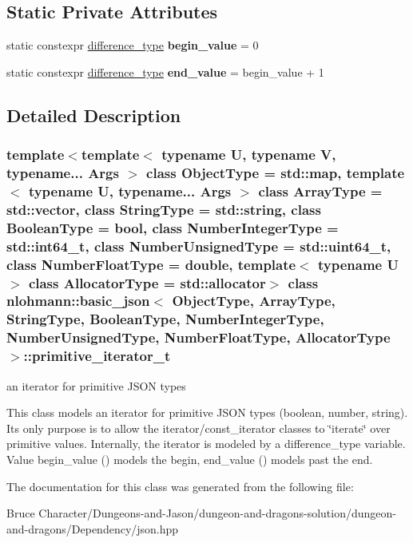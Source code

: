 \subsection*{Static Private Attributes}
\begin{DoxyCompactItemize}
\item 
\hypertarget{classnlohmann_1_1basic__json_1_1primitive__iterator__t_ae79dfabea850815bbf51e9e9a4841e5c}{}\label{classnlohmann_1_1basic__json_1_1primitive__iterator__t_ae79dfabea850815bbf51e9e9a4841e5c} 
static constexpr \hyperlink{classnlohmann_1_1basic__json_aec316934a555dd1acdd3600e5d4a4cdf}{difference\+\_\+type} {\bfseries begin\+\_\+value} = 0
\item 
\hypertarget{classnlohmann_1_1basic__json_1_1primitive__iterator__t_ac36f28f0a0d90ce02d086b5b05e5c7f3}{}\label{classnlohmann_1_1basic__json_1_1primitive__iterator__t_ac36f28f0a0d90ce02d086b5b05e5c7f3} 
static constexpr \hyperlink{classnlohmann_1_1basic__json_aec316934a555dd1acdd3600e5d4a4cdf}{difference\+\_\+type} {\bfseries end\+\_\+value} = begin\+\_\+value + 1
\end{DoxyCompactItemize}


\subsection{Detailed Description}
\subsubsection*{template$<$template$<$ typename U, typename V, typename... Args $>$ class Object\+Type = std\+::map, template$<$ typename U, typename... Args $>$ class Array\+Type = std\+::vector, class String\+Type = std\+::string, class Boolean\+Type = bool, class Number\+Integer\+Type = std\+::int64\+\_\+t, class Number\+Unsigned\+Type = std\+::uint64\+\_\+t, class Number\+Float\+Type = double, template$<$ typename U $>$ class Allocator\+Type = std\+::allocator$>$\newline
class nlohmann\+::basic\+\_\+json$<$ Object\+Type, Array\+Type, String\+Type, Boolean\+Type, Number\+Integer\+Type, Number\+Unsigned\+Type, Number\+Float\+Type, Allocator\+Type $>$\+::primitive\+\_\+iterator\+\_\+t}

an iterator for primitive J\+S\+ON types 

This class models an iterator for primitive J\+S\+ON types (boolean, number, string). It\textquotesingle{}s only purpose is to allow the iterator/const\+\_\+iterator classes to \char`\"{}iterate\char`\"{} over primitive values. Internally, the iterator is modeled by a {\ttfamily difference\+\_\+type} variable. Value begin\+\_\+value ({}) models the begin, end\+\_\+value ({}) models past the end. 

The documentation for this class was generated from the following file\+:\begin{DoxyCompactItemize}
\item 
Bruce Character/\+Dungeons-\/and-\/\+Jason/dungeon-\/and-\/dragons-\/solution/dungeon-\/and-\/dragons/\+Dependency/json.\+hpp\end{DoxyCompactItemize}
